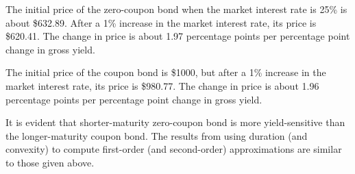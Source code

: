 \documentclass[12pt]{article}
\begin{document}
The initial price of the zero-coupon bond when the market interest rate is 25\% is about \$632.89. After a 1\% increase in the market interest rate, its price is \$620.41. The change in price is about 1.97 percentage points per percentage point change in gross yield.

The initial price of the coupon bond is \$1000, but after a 1\% increase in the market interest rate, its price is \$980.77. The change in price is about 1.96 percentage points per percentage point change in gross yield.

It is evident that shorter-maturity zero-coupon bond is more yield-sensitive than the longer-maturity coupon bond. The results from using duration (and convexity) to compute first-order (and second-order) approximations are similar to those given above.
\end{document}
